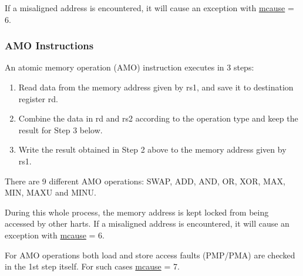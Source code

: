 \documentclass[main\_\_EN.tex]{subfiles}
\begin{document}
If a misaligned address is encountered, it will cause an exception with \hyperref[regdesc:MCAUSE]{mcause} = 6.

\subsubsection{AMO Instructions}
\label{sec:riscvcpu-atomic-amo}

An atomic memory operation (AMO) instruction executes in 3 steps:

\begin{enumerate}
    \item Read data from the memory address given by rs1, and save it to destination register rd.
    \item Combine the data in rd and rs2 according to the operation type and keep the result for Step 3 below.
    \item Write the result obtained in Step 2 above to the memory address given by rs1.
\end{enumerate}

There are 9 different AMO operations: SWAP, ADD, AND, OR, XOR, MAX, MIN, MAXU and MINU.

During this whole process, the memory address is kept locked from being accessed by other harts. If a misaligned address is encountered, it will cause an exception with \hyperref[regdesc:MCAUSE]{mcause} = 6.

For AMO operations both load and store access faults (PMP/PMA) are checked in the 1st step itself. For such cases \hyperref[regdesc:MCAUSE]{mcause} = 7.
\end{document}
